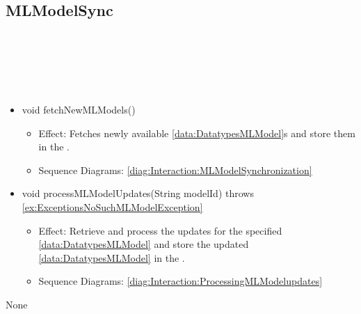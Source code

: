   \subsection{MLModelSync}\label{int:InterfacesMLModelSync}
    \begin{description}
      \item[Provided by:] \iconcomponent{}~
      \item[Required by:] \iconcomponent{}~ 
      \item[Operations:] ~
    \begin{itemize}[noitemsep,nolistsep,leftmargin=-.25cm]
      \item \textsf{void fetchNewMLModels()}
        \begin{itemize}[noitemsep,nolistsep]
           \item Effect: Fetches newly available \ref{data:DatatypesMLModel}s and store them in the . 
           \item Sequence Diagrams: \cref{diag:Interaction:MLModelSynchronization}
        \end{itemize}
      \item \textsf{void processMLModelUpdates(String modelId) throws \ref{ex:ExceptionsNoSuchMLModelException}}
        \begin{itemize}[noitemsep,nolistsep]
           \item Effect: Retrieve and process the updates for the specified \ref{data:DatatypesMLModel} and store the updated \ref{data:DatatypesMLModel} in the . 
           \item Sequence Diagrams: \cref{diag:Interaction:ProcessingMLModelupdates}
        \end{itemize}
    \end{itemize}
      \item[Diagrams:] None
    \end{description}

